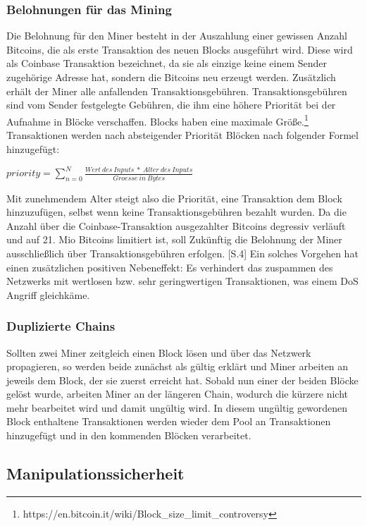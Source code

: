 \subsubsection{Belohnungen für das Mining}
Die Belohnung für den Miner besteht in der Auszahlung einer gewissen Anzahl Bitcoins, die als erste Transaktion des neuen Blocks ausgeführt wird. Diese wird als Coinbase Transaktion bezeichnet, da sie als einzige keine einem Sender zugehörige Adresse hat, sondern die Bitcoins neu erzeugt werden. Zusätzlich erhält der Miner alle anfallenden Transaktionsgebühren. Transaktionsgebühren sind vom Sender festgelegte Gebühren, die ihm eine höhere Priorität bei der Aufnahme in Blöcke verschaffen. Blocks haben eine maximale Größe.\footnote{https://en.bitcoin.it/wiki/Block\_size\_limit\_controversy}
Transaktionen werden nach absteigender Priorität Blöcken nach folgender Formel hinzugefügt:\\
\begin{center}
	$priority = \sum\nolimits_{n=0}^N \frac{Wert\ des\ Inputs\ *\ Alter\ des\ Inputs}{Groesse\ in\ Bytes}$
\end{center}


	Mit zunehmendem Alter steigt also die Priorität, eine Transaktion dem Block hinzuzufügen, selbst wenn keine Transaktionsgebühren bezahlt wurden. Da die Anzahl über die Coinbase-Transaktion ausgezahlter Bitcoins degressiv verläuft und auf 21. Mio Bitcoins limitiert ist, soll Zukünftig die Belohnung der Miner ausschließlich über Transaktionsgebühren erfolgen. \cite{Nakamoto.31.10.2008}[S.4]
	Ein solches Vorgehen hat einen zusätzlichen positiven Nebeneffekt: Es verhindert das \glqq zuspammen\grqq{} des Netzwerks mit wertlosen bzw. sehr geringwertigen Transaktionen, was einem \ac{DoS} Angriff gleichkäme.

\subsubsection{Duplizierte Chains}
Sollten zwei Miner zeitgleich einen Block lösen und über das Netzwerk propagieren, so werden beide zunächst als gültig erklärt und Miner arbeiten an jeweils dem Block, der sie zuerst erreicht hat. Sobald nun einer der beiden Blöcke gelöst wurde, arbeiten Miner an der längeren Chain, wodurch die kürzere nicht mehr bearbeitet wird und damit ungültig wird. In diesem ungültig gewordenen Block enthaltene Transaktionen werden wieder dem Pool an Transaktionen hinzugefügt und in den kommenden Blöcken verarbeitet. 
\subsection{Manipulationssicherheit}
